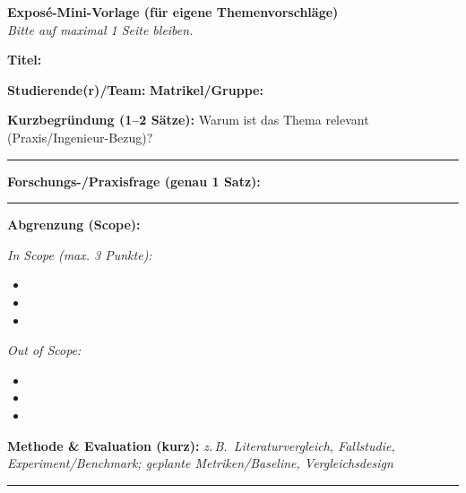 
\newpage
\begingroup
\setlength{\parindent}{0pt}
\setlength{\parskip}{0.35em}

\begin{center}
  {\Large \textbf{Exposé-Mini-Vorlage (für eigene Themenvorschläge)}}\\
  \normalsize \emph{Bitte auf maximal 1 Seite bleiben.}
\end{center}

\textbf{Titel:} \hrulefill

\textbf{Studierende(r)/Team:} \hrulefill\quad
\textbf{Matrikel/Gruppe:} \hrulefill

\textbf{Kurzbegründung (1–2 Sätze):} Warum ist das Thema relevant (Praxis/Ingenieur-Bezug)?\\
\rule{\textwidth}{0.6pt}

\textbf{Forschungs-/Praxisfrage (genau 1 Satz):}\\
\rule{\textwidth}{0.6pt}

\textbf{Abgrenzung (Scope):}\par\smallskip
\begin{minipage}[t]{0.46\textwidth}\raggedright
\textit{In Scope (max. 3 Punkte):}
\begin{itemize}[leftmargin=*,itemsep=0.1em]
  \item \;
  \item \;
  \item \;
\end{itemize}
\end{minipage}\hfill
\begin{minipage}[t]{0.46\textwidth}\raggedright
\textit{Out of Scope:}
\begin{itemize}[leftmargin=*,itemsep=0.1em]
  \item \;
  \item \;
  \item \;
\end{itemize}
\end{minipage}

\textbf{Methode \& Evaluation (kurz):} \emph{z.\,B.\ Literaturvergleich, Fallstudie, Experiment/Benchmark; geplante Metriken/Baseline, Vergleichsdesign}\\
\rule{\textwidth}{0.6pt}

